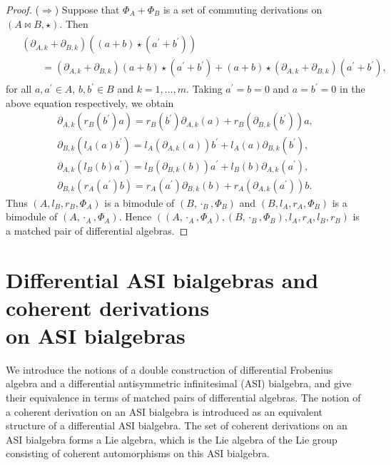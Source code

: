 \documentclass[10pt,a4paper]{amsart}
\numberwithin{equation}{section}
\begin{document}
\begin{proof}
 ($\Longrightarrow$)
 Suppose that $\Phi_A + \Phi_B$ is a set of commuting derivations on $(A \bowtie B, \star)$.
 Then
 \begin{gather*}
\begin{split}
& (\partial_{A, k}+\partial_{B,k})((a + b) \star (a^\prime + b^\prime))\\
& \qquad{} = (\partial_{A, k} + \partial_{B,k})(a + b) \star (a^\prime + b^\prime) + (a+b)\star (\partial_{A, k}+\partial_{B,k})(a^\prime + b^\prime),
 \end{split}
 \end{gather*}
 for all $a, a^\prime \in A$, $b, b^\prime \in B$ and $k=1, \dots, m$.
 Taking $a^\prime = b = 0$ and $a = b^\prime = 0$ in the above equation respectively, we obtain
 \begin{gather*}
\partial_{A,k}(r_B(b^\prime)a) = r_B(b^\prime)\partial_{A,k}(a) + r_B(\partial_{B,k}(b^\prime))a, \\
 \partial_{B,k}(l_A(a)b^\prime) = l_A(\partial_{A,k}(a))b^\prime + l_A(a)\partial_{B,k}(b^\prime), \\
 \partial_{A,k}(l_B(b)a^\prime) = l_B(\partial_{B,k}(b))a^\prime + l_B(b)\partial_{A,k}(a^\prime), \\
 \partial_{B,k}(r_A(a^\prime)b) = r_A(a^\prime)\partial_{B,k}(b) + r_A(\partial_{A,k}(a^\prime))b.
 \end{gather*}
 Thus $(A, l_B, r_B, \Phi_A)$ is a bimodule of $(B, \cdot_B, \Phi_B)$ and $(B, l_A, r_A, \Phi_B)$ is a bimodule of $(A, \cdot_A, \Phi_A)$.
 Hence $((A, \cdot_A, \Phi_A), (B, \cdot_B, \Phi_B), l_A, r_A, l_B, r_B)$ is a matched pair of differential algebras.
\end{proof}

\section[Differential ASI bialgebras and coherent derivations on ASI bialgebras]{Differential ASI bialgebras and coherent derivations\\ on ASI bialgebras}\label{sec:dasi}

We introduce the notions of a double construction of differential
Frobenius algebra and a differential antisymmetric infinitesimal
(ASI) bialgebra, and give their equivalence in terms of matched
pairs of differential algebras. The notion of a coherent
derivation on an ASI bialgebra is introduced as an equivalent
structure of a differential ASI bialgebra. The set of coherent
derivations on an ASI bialgebra forms a Lie algebra, which is the
Lie algebra of the Lie group consisting of coherent automorphisms on this ASI bialgebra.
\end{document}
